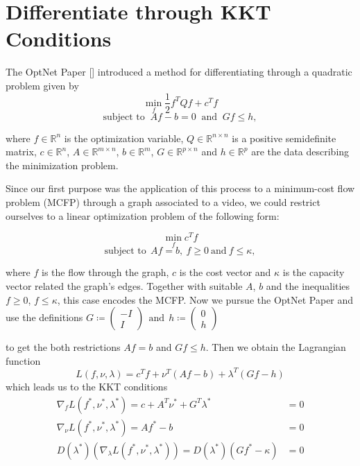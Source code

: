\documentclass{article}
\begin{document}
\section{Differentiate through KKT Conditions}
\label{others}

The OptNet Paper [] introduced a method for differentiating through a quadratic problem given by
\[ \min_f \frac{1}{2} f^T Q f + c^T f \]
\[\text{subject to }~  Af-b=0 ~\text{ and }~ Gf \leq h, \]

where $f\in \mathbb{R}^n$ is the optimization variable, $Q\in \mathbb{R}^{n\times n}$ is a positive semidefinite matrix, $c\in \mathbb{R}^n$, $A\in \mathbb{R}^{m\times n}$, $b\in \mathbb{R}^m$, $G\in \mathbb{R}^{p\times n}$ and $h\in \mathbb{R}^p$ are the data describing the minimization problem. 

Since our first purpose was the application of this process to a minimum-cost flow problem (MCFP) through a graph associated to a video, we could restrict ourselves to a linear optimization problem of the following form:

\[\min_f c^T f\] 
\[ \text{subject to} ~~Af=b,~f\geq 0 ~\text{and}~ f \leq \kappa,\]

where $f$ is the flow through the graph, $c$ is the cost vector and $\kappa$ is the capacity vector related the graph's edges. Together with suitable $A$, $b$ and the inequalities $f\geq 0$, $f\leq \kappa$, this case encodes the MCFP. Now we pursue the OptNet Paper and use the definitions
$G\coloneqq \begin{pmatrix} -I \\  I \end{pmatrix} ~~\text{and} ~~ h\coloneqq \begin{pmatrix} 0 \\ h \end{pmatrix} $

to get the both restrictions $Af=b$ and $Gf\leq h$. Then we obtain the Lagrangian function
\[L(f, \nu, \lambda) = c^T f + \nu ^T (Af-b) + \lambda^T(Gf-h)\]
which leads us to the KKT conditions
\begin{align*}
\nabla_f L(f^*,\nu^*, \lambda^*) = c + A^T \nu^*  + G^T\lambda^* &= 0 \\
\nabla _\nu L(f^*, \nu^*, \lambda^*) = Af^* - b &= 0 \\
D(\lambda^*) (\nabla_\lambda L(f^*, \nu^*, \lambda^*)) = D(\lambda^*)(Gf^*-\kappa) &= 0
\end{align*}
\end{document}
